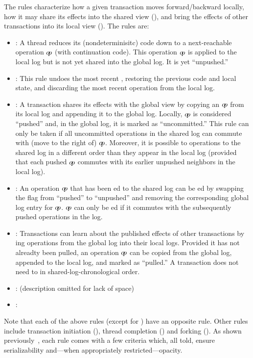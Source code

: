 The rules characterize how a given transaction moves forward/backward
locally, how it may share its effects into the shared view (\PUSH),
and bring the effects of other transactions into its local view
(\PULL). The rules are:
\begin{itemize}
\item \APPLY: A thread reduces its (nondeterminisitc) code down to a
  next-reachable operation $o\!p$ (with continuation code). This
  operation $o\!p$ is applied to the local log but is not yet shared
  into the global log. It is yet ``unpushed.''

\item \UNAPP: This rule undoes the most recent \APPLY, restoring the
  previous code and local state, and discarding the most recent
  operation from the local log.

\item \PUSH: A transaction shares its effects with the global view by
  copying an $o\!p$ from its local log and appending it to the global
  log. Locally, $o\!p$ is considered ``pushed'' and, in the global log,
  it is marked as ``uncommitted.''
%
  This rule can only be taken if all uncommitted operations in the
  shared log can commute with (move to the right of) $o\!p$.
%
  Moreover, it is possible to \PUSH{} operations to the shared log in
  a different order than they appear in the local log (provided that
  each pushed $o\!p$ commutes with its earlier unpushed neighbors in the local log).

\item \UNPUSH: An operation $o\!p$ that has been \PUSH{}ed to the
  shared log can be \UNPUSH{}ed by swapping the flag from ``pushed''
  to ``unpushed'' and removing the corresponding global log entry for
  $o\!p$. $o\!p$ can only be \UNPUSH{}ed if it commutes with the
  subsequently pushed operations in the log.

\item \PULL:
%
  Transactions can learn about the published effects of other
  transactions by \PULL{}ing operations from the global log into their
  local logs. Provided it has not alreadty been pulled, an operation
  $o\!p$ can be copied from the global log, appended to the local log,
  and marked as ``pulled.'' A transaction does not need to \PULL{} in
  shared-log-chronological order.

\item \UNPULL: (description omitted for lack of space)

\item \CMT: 
\end{itemize}
Note that each of the above rules (except for \CMT) have an opposite rule.
%
Other rules include transaction initiation (\BEGIN),
thread completion (\FIN) and forking (\FORK).
As shown previously~\cite{KP:PLDI15}, each rule comes with a few
criteria which, all told, ensure serializability and---when
appropriately restricted---opacity.




